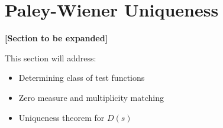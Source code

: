 \section{Paley-Wiener Uniqueness}
\label{sec:pw_uniqueness}

\textbf{[Section to be expanded]}

This section will address:
\begin{itemize}
\item Determining class of test functions
\item Zero measure and multiplicity matching
\item Uniqueness theorem for $D(s)$
\end{itemize}
